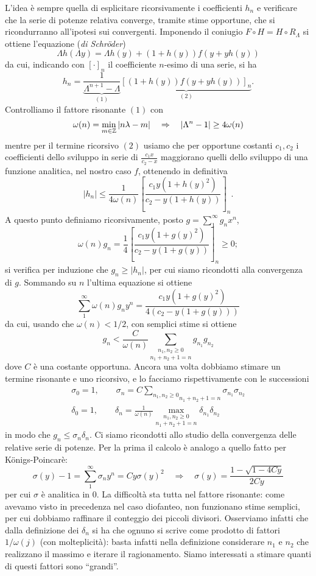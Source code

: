 L'idea è sempre quella di esplicitare ricorsivamente i coefficienti $h_n$ e verificare che la serie di potenze relativa converge, tramite stime opportune, che si ricondurranno all'ipotesi sui convergenti. Imponendo il coniugio $F\circ H=H\circ R_\Lambda$ si ottiene l'equazione (\emph{di Schr\"oder})
\[\Lambda h(\Lambda y)=\Lambda h(y) +(1+h(y))f(y+yh(y))\]
da cui, indicando con $[\cdot]_n$ il coefficiente $n$-esimo di una serie, si ha
\[h_n=\underbrace{\frac{1}{\Lambda^{n+1}-\Lambda}}_{(1)}\underbrace{\left[(1+h(y))f(y+yh(y))\right]_n}_{(2)}.\]
Controlliamo il fattore risonante $(1)$ con 
\[\omega(n)=\min_{m\in \mathbb{Z}} |n\lambda-m| \quad \Rightarrow \quad |\Lambda^n-1|\geq 4\omega(n)\]
mentre per il termine ricorsivo $(2)$ usiamo che per opportune costanti $c_1,c_2$ i coefficienti dello sviluppo in serie di $\frac{c_1 x}{c_2-x}$ maggiorano quelli dello sviluppo di una funzione analitica, nel nostro caso $f$, ottenendo in definitiva
\[|h_n|\leq \frac{1}{4\omega(n)} \left[\frac{c_1 y (1+h(y)^2)}{c_2-y(1+h(y))}\right]_n.\]
A questo punto definiamo ricorsivamente, posto $g=\sum_1^\infty g_n x^n$,
\[\omega(n) g_n=\frac{1}{4} \left[\frac{c_1 y (1+g(y)^2)}{c_2-y(1+g(y))}\right]_n\geq 0;\]
si verifica per induzione che $g_n\geq|h_n|$, per cui siamo ricondotti alla convergenza di $g$. Sommando su $n$ l'ultima equazione si ottiene
\[\sum_1^\infty \omega(n) g_n y^n=\frac{c_1 y (1+g(y)^2)}{4(c_2-y(1+g(y)))} \]
da cui, usando che $\omega(n)<1/2$, con semplici stime si ottiene
\[g_n<\frac{C}{\omega(n)}\underset{n_1+n_2+1=n}{\sum_{n_1,n_2\geq 0}}g_{n_1}g_{n_2}\]
dove $C$ è una costante opportuna. Ancora una volta dobbiamo stimare un termine risonante e uno ricorsivo, e lo facciamo rispettivamente con le successioni
\begin{eqnarray*}
  \sigma_0=1, \qquad
  \sigma_n=C \underset{n_1+n_2+1=n}{\sum_{n_1,n_2\geq 0}}\sigma_{n_1}\sigma_{n_2}
 \\
  \delta_0=1, \qquad
  \delta_n=\frac{1}{\omega(n)}\underset{n_1+n_2+1=n}{\max_{n_1,n_2\geq 0}}\delta_{n_1}\delta_{n_2}
\end{eqnarray*}
in modo che $g_n\leq \sigma_n \delta_n$. Ci siamo ricondotti allo studio della convergenza delle relative serie di potenze.
Per la prima il calcolo è analogo a quello fatto per K\"onigs-Poincarè: 
\[\sigma(y)-1=\sum_1^\infty \sigma_n y^n=Cy\sigma(y)^2 \quad \Rightarrow \quad \sigma(y)=\frac{1-\sqrt{1-4Cy}}{2Cy}\]
per cui $\sigma$ è analitica in $0$.
La difficoltà sta tutta nel fattore risonante: come avevamo visto in precedenza nel caso diofanteo, non funzionano stime semplici, per cui dobbiamo raffinare il conteggio dei piccoli divisori. Osserviamo infatti che dalla definizione dei $\delta_n$ si ha che ognuno si scrive come prodotto di fattori $1/\omega(j)$ (con molteplicità): basta infatti nella definizione considerare $n_1$ e $n_2$ che realizzano il massimo e iterare il ragionamento. Siamo interessati a stimare quanti di questi fattori sono ``grandi''.\newline\indent
